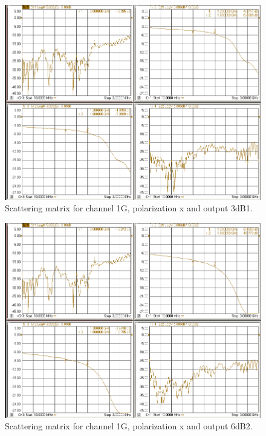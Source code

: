 \documentclass[12pt,a4paper,oneside]{article}
\begin{document}
\begin{figure}[H]
\centering
\includegraphics[width=0.9\linewidth]{VNA_results/1Gx_3dB1.png}
\caption{Scattering matrix for channel 1G, polarization x and output 3dB1.}
\label{fig:1Gx_3dB1}
\end{figure}


\begin{figure}[H]
\centering
\includegraphics[width=0.9\linewidth]{VNA_results/1Gx_6dB2.png}
\caption{Scattering matrix for channel 1G, polarization x and output 6dB2.}
\label{fig:1Gx_6dB2}
\end{figure}
\end{document}

